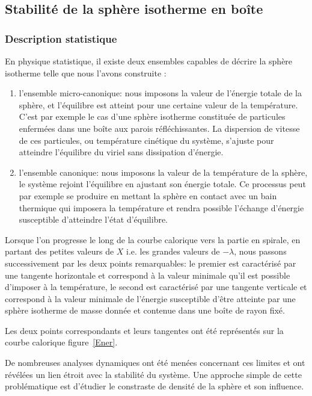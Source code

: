 \subsection{Stabilité de la sphère isotherme en boîte}
\subsubsection{Description statistique}
	En physique statistique, il existe deux ensembles capables de décrire la sphère isotherme telle que nous l'avons construite :
	\begin{enumerate}

		\item l'ensemble micro-canonique: nous imposons la valeur de l'énergie totale de la sphère, et
			l'équilibre est atteint pour une certaine valeur de la température. C'est par exemple le cas
			d'une sphère isotherme constituée de particules enfermées dans une boîte aux parois
			réfléchissantes. La dispersion de vitesse de ces particules, ou température cinétique du
			système, s'ajuste pour atteindre l'équilibre du viriel sans dissipation d'énergie.
		
		\item l'ensemble canonique: nous imposons la valeur de la température de la sphère, le système rejoint
			l'équilibre en ajustant son énergie totale. Ce processus peut par exemple se produire en mettant
			la sphère en contact avec un bain thermique qui imposera la température et rendra possible
			l'échange d'énergie susceptible d'atteindre l'état d'équilibre.
		
	\end{enumerate}

	Lorsque l'on progresse le long de la courbe calorique vers la partie en spirale, en partant des petites valeurs
	de $X$ i.e. les grandes valeurs de $-\lambda$, nous passons successivement par les deux points remarquables: le
	premier est caractérisé par une tangente horizontale et correspond à la valeur minimale qu'il est possible d'imposer à
	la température, le second est caractérisé par une tangente verticale et correspond à la valeur minimale de
	l'énergie susceptible d'être atteinte par une sphère isotherme de masse donnée et contenue dans une boîte de
	rayon fixé.
	
	Les deux points correspondants et leurs tangentes ont été représentés sur la courbe calorique figure~\ref{Ener}.
	
	De nombreuses analyses dynamiques ont été menées concernant ces limites
	et ont révélées un lien étroit avec la stabilité du système. Une
	approche simple de cette problématique est d'étudier le constraste de
	densité de la sphère et son influence.
	
